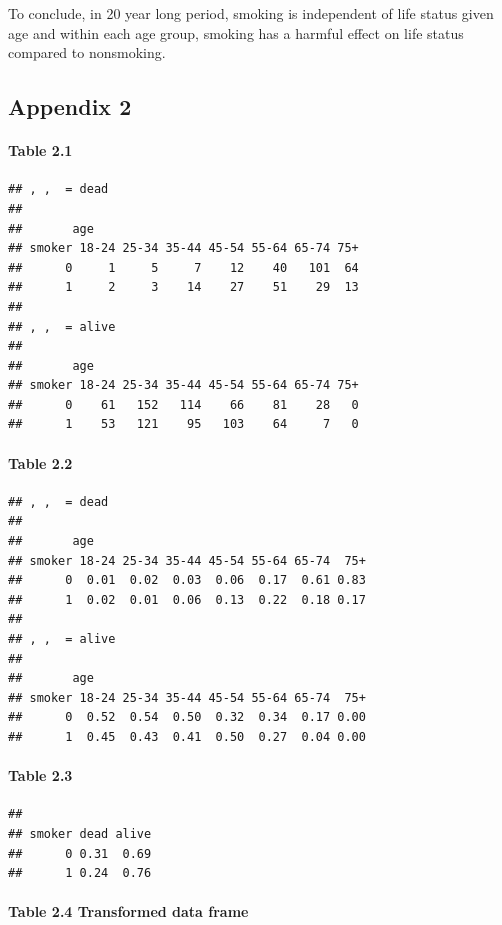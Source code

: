 \documentclass[]{article}
\let\oldparagraph\paragraph
\renewcommand{\paragraph}[1]{\oldparagraph{#1}\mbox{}}
\begin{document}
To conclude, in 20 year long period, smoking is independent of life
status given age and within each age group, smoking has a harmful effect
on life status compared to nonsmoking.

\subsection{Appendix 2}\label{appendix-2}

\paragraph{Table 2.1}\label{table-2.1}

\begin{verbatim}
## , ,  = dead
## 
##       age
## smoker 18-24 25-34 35-44 45-54 55-64 65-74 75+
##      0     1     5     7    12    40   101  64
##      1     2     3    14    27    51    29  13
## 
## , ,  = alive
## 
##       age
## smoker 18-24 25-34 35-44 45-54 55-64 65-74 75+
##      0    61   152   114    66    81    28   0
##      1    53   121    95   103    64     7   0
\end{verbatim}

\paragraph{Table 2.2}\label{table-2.2}

\begin{verbatim}
## , ,  = dead
## 
##       age
## smoker 18-24 25-34 35-44 45-54 55-64 65-74  75+
##      0  0.01  0.02  0.03  0.06  0.17  0.61 0.83
##      1  0.02  0.01  0.06  0.13  0.22  0.18 0.17
## 
## , ,  = alive
## 
##       age
## smoker 18-24 25-34 35-44 45-54 55-64 65-74  75+
##      0  0.52  0.54  0.50  0.32  0.34  0.17 0.00
##      1  0.45  0.43  0.41  0.50  0.27  0.04 0.00
\end{verbatim}

\paragraph{Table 2.3}\label{table-2.3}

\begin{verbatim}
##       
## smoker dead alive
##      0 0.31  0.69
##      1 0.24  0.76
\end{verbatim}

\paragraph{Table 2.4 Transformed data
frame}\label{table-2.4-transformed-data-frame}
\end{document}
